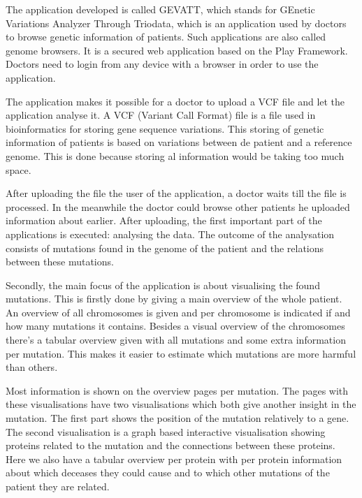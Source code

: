 The application developed is called GEVATT, which stands for GEnetic Variations Analyzer Through Triodata, which is an application used by doctors to browse genetic information of patients. Such applications are also called genome browsers. It is a secured web application based on the Play Framework. Doctors need to login from any device with a browser in order to use the application.

The application makes it possible for a doctor to upload a VCF file and let the application analyse it. A VCF (Variant Call Format) file is a file used in bioinformatics for storing gene sequence variations. This storing of genetic information of patients is based on variations between de patient and a reference genome. This is done because storing al information would be taking too much space.

After uploading the file the user of the application, a doctor waits till the file is processed. In the meanwhile the doctor could browse other patients he uploaded information about earlier. After uploading, the first important part of the applications is executed: analysing the data. The outcome of the analysation consists of mutations found in the genome of the patient and the relations between these mutations.

Secondly, the main focus of the application is about visualising the found mutations. This is firstly done by giving a main overview of the whole patient. An overview of all chromosomes is given and per chromosome is indicated if and how many mutations it contains. Besides a visual overview of the chromosomes there's a tabular overview given with all mutations and some extra information per mutation. This makes it easier to estimate which mutations are more harmful than others.

Most information is shown on the overview pages per mutation. The pages with these visualisations have two visualisations which both give another insight in the mutation. The first part shows the position of the mutation relatively to a gene. The second visualisation is a graph based interactive visualisation showing proteins related to the mutation and the connections between these proteins. Here we also have a tabular overview per protein with per protein information about which deceases they could cause and to which other mutations of the patient they are related.